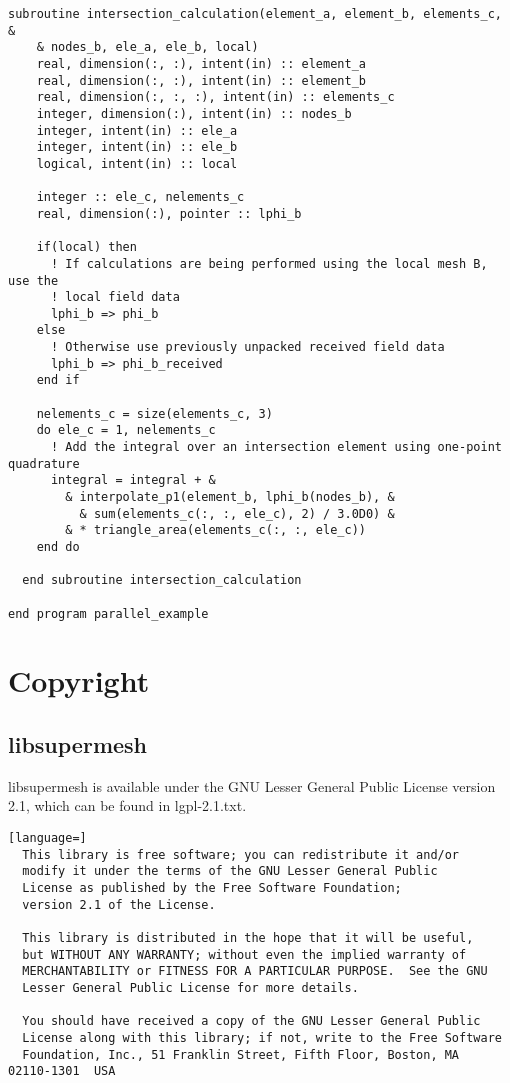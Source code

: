 \documentclass{article}
\begin{document}
\begin{lstlisting}[language=FORTRAN]
  subroutine intersection_calculation(element_a, element_b, elements_c, &
    & nodes_b, ele_a, ele_b, local)
    real, dimension(:, :), intent(in) :: element_a
    real, dimension(:, :), intent(in) :: element_b
    real, dimension(:, :, :), intent(in) :: elements_c
    integer, dimension(:), intent(in) :: nodes_b
    integer, intent(in) :: ele_a
    integer, intent(in) :: ele_b
    logical, intent(in) :: local

    integer :: ele_c, nelements_c
    real, dimension(:), pointer :: lphi_b
    
    if(local) then
      ! If calculations are being performed using the local mesh B, use the
      ! local field data
      lphi_b => phi_b
    else
      ! Otherwise use previously unpacked received field data
      lphi_b => phi_b_received
    end if

    nelements_c = size(elements_c, 3)
    do ele_c = 1, nelements_c
      ! Add the integral over an intersection element using one-point quadrature
      integral = integral + &
        & interpolate_p1(element_b, lphi_b(nodes_b), &
          & sum(elements_c(:, :, ele_c), 2) / 3.0D0) &
        & * triangle_area(elements_c(:, :, ele_c))
    end do    
    
  end subroutine intersection_calculation
  
end program parallel_example
\end{lstlisting}

\section{Copyright}\label{sect:copyright}

\subsection{libsupermesh}

libsupermesh is available under the GNU Lesser General Public License
version 2.1, which can be found in lgpl-2.1.txt.

\begin{lstlisting}[language=]
  This library is free software; you can redistribute it and/or
  modify it under the terms of the GNU Lesser General Public
  License as published by the Free Software Foundation;
  version 2.1 of the License.

  This library is distributed in the hope that it will be useful,
  but WITHOUT ANY WARRANTY; without even the implied warranty of
  MERCHANTABILITY or FITNESS FOR A PARTICULAR PURPOSE.  See the GNU
  Lesser General Public License for more details.

  You should have received a copy of the GNU Lesser General Public
  License along with this library; if not, write to the Free Software
  Foundation, Inc., 51 Franklin Street, Fifth Floor, Boston, MA  02110-1301  USA
\end{lstlisting}
\end{document}
